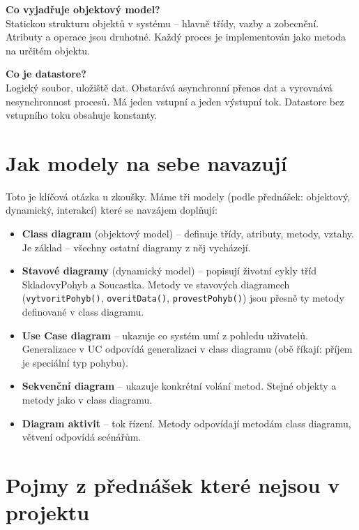 \documentclass[12pt, a4paper]{article}
\begin{document}
\textbf{Co vyjadřuje objektový model?}\\
Statickou strukturu objektů v systému -- hlavně třídy, vazby a zobecnění. Atributy a operace jsou druhotné. Každý proces je implementován jako metoda na určitém objektu.

\textbf{Co je datastore?}\\
Logický soubor, uložiště dat. Obstarává asynchronní přenos dat a vyrovnává nesynchronnost procesů. Má jeden vstupní a jeden výstupní tok. Datastore bez vstupního toku obsahuje konstanty.

\section{Jak modely na sebe navazují}

Toto je klíčová otázka u zkoušky. Máme tři modely (podle přednášek: objektový, dynamický, interakcí) které se navzájem doplňují:

\begin{itemize}
  \item \textbf{Class diagram} (objektový model) -- definuje třídy, atributy, metody, vztahy. Je základ -- všechny ostatní diagramy z něj vycházejí.
  \item \textbf{Stavové diagramy} (dynamický model) -- popisují životní cykly tříd SkladovyPohyb a Soucastka. Metody ve stavových diagramech (\texttt{vytvoritPohyb()}, \texttt{overitData()}, \texttt{provestPohyb()}) jsou přesně ty metody definované v class diagramu.
  \item \textbf{Use Case diagram} -- ukazuje co systém umí z pohledu uživatelů. Generalizace v UC odpovídá generalizaci v class diagramu (obě říkají: příjem je speciální typ pohybu).
  \item \textbf{Sekvenční diagram} -- ukazuje konkrétní volání metod. Stejné objekty a metody jako v class diagramu.
  \item \textbf{Diagram aktivit} -- tok řízení. Metody odpovídají metodám class diagramu, větvení odpovídá scénářům.
\end{itemize}


\section{Pojmy z přednášek které nejsou v projektu}
\end{document}
